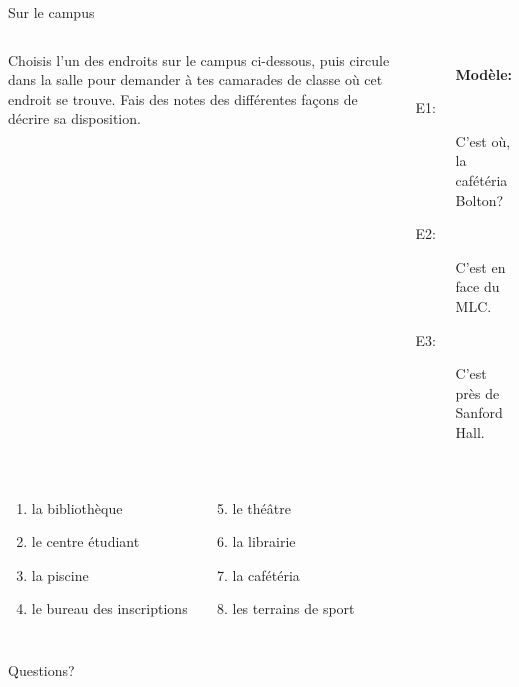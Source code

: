 \documentclass{beamer}
\begin{document}
  \begin{frame}{Sur le campus}
    \begin{columns}
        Choisis l'un des endroits sur le campus ci-dessous, puis circule dans la salle pour demander à tes camarades de classe où cet endroit se trouve.
        Fais des notes des différentes façons de décrire sa disposition. \\
        {\small
        \begin{description}
          \item[] \textbf{Modèle:}
          \item[E1:] C'est où, la cafétéria Bolton?
          \item[E2:] C'est en face du MLC.
          \item[E3:] C'est près de Sanford Hall.
        \end{description}
        }
    \end{columns}
    \vspace{0.5cm}
    \begin{columns}
        \begin{enumerate}
          \item la bibliothèque
          \item le centre étudiant
          \item la piscine
          \item le bureau des inscriptions
        \end{enumerate}
        \begin{enumerate}
          \setcounter{enumi}{4}
          \item le théâtre
          \item la librairie
          \item la cafétéria
          \item les terrains de sport
        \end{enumerate}
    \end{columns}
  \end{frame}

  \begin{frame}{}
    \begin{center}
      \Large Questions?
    \end{center}
  \end{frame}
\end{document}
